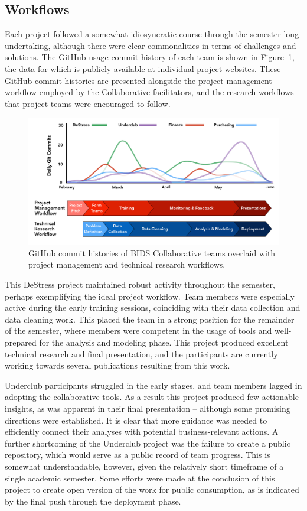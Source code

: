 \documentclass[12pt]{article}
\begin{document}
\subsection{Workflows}

Each project followed a somewhat idiosyncratic course through the semester-long undertaking, although there were clear commonalities in terms of challenges and solutions.  The GitHub usage commit history of each team is shown in Figure~\ref{fig:gitcommits}, the data for which is publicly available at individual project websites.  These GitHub commit histories are presented alongside the project management workflow employed by the Collaborative facilitators, and the research workflows that project teams were encouraged to follow.

\begin{figure}[h]
\centerline{\includegraphics[scale=0.435]{BIDS_Collaborative_Workflow_NEW.png}}
\caption{GitHub commit histories of BIDS Collaborative teams overlaid with project management and technical research workflows.}
\label{fig:gitcommits}
\end{figure}


This DeStress project maintained robust activity throughout the semester, perhaps exemplifying the ideal project workflow.  Team members were especially active during the early training sessions, coinciding with their data collection and data cleaning work.  This placed the team in a strong position for the remainder of the semester, where members were competent in the usage of tools and well-prepared for the analysis and modeling phase.  This project produced excellent technical research and final presentation, and the participants are currently working towards several publications resulting from this work.

Underclub participants struggled in the early stages, and team members lagged in adopting the collaborative tools.  As a result this project produced few actionable insights, as was apparent in their final presentation -- although some promising directions were established. It is clear that more guidance was needed to efficiently connect their analyses with potential business-relevant actions.  A further shortcoming of the Underclub project was the failure to create a public repository, which would serve as a public record of team progress. This is somewhat understandable, however, given the relatively short timeframe of a single academic semester.  Some efforts were made at the conclusion of this project to create open version of the work for public consumption, as is indicated by the final push through the deployment phase.
\end{document}
